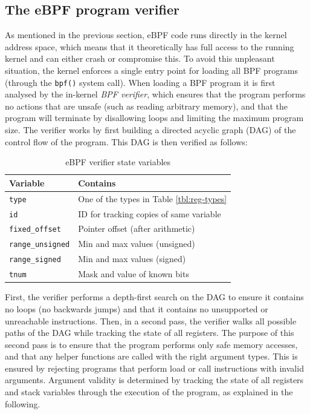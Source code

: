 \documentclass[10pt,sigconf]{acmart}
\begin{document}
\subsection{The eBPF program verifier}
\label{sec:bpf-verifier}
As mentioned in the previous section, eBPF code runs directly in the kernel
address space, which means that it theoretically has full access to the running
kernel and can either crash or compromise this. To avoid this unpleasant
situation, the kernel enforces a single entry point for loading all BPF programs
(through the \texttt{bpf()} system call). When loading a BPF program it is first
analysed by the in-kernel \emph{BPF verifier}, which ensures that the program
performs no actions that are unsafe (such as reading arbitrary memory), and that
the program will terminate by disallowing loops and limiting the maximum program
size. The verifier works by first building a directed acyclic graph (DAG) of the
control flow of the program. This DAG is then verified as follows:

\begin{table}[tbp]
\caption{\label{tbl:vrf-state-vars}
eBPF verifier state variables}
\centering
\begin{tabular}{ll}
\toprule
Variable & Contains\\
\midrule
\texttt{type} & One of the types in Table \ref{tbl:reg-types}\\
\texttt{id} & ID for tracking copies of same variable\\
\texttt{fixed\_offset} & Pointer offset (after arithmetic)\\
\texttt{range\_unsigned} & Min and max values (unsigned)\\
\texttt{range\_signed} & Min and max values (signed)\\
\texttt{tnum} & Mask and value of known bits\\
\bottomrule
\end{tabular}
\end{table}

First, the verifier performs a depth-first search on the DAG to ensure it
contains no loops (no backwards jumps) and that it contains no unsupported or
unreachable instructions. Then, in a second pass, the verifier walks all
possible paths of the DAG while tracking the state of all registers. The purpose
of this second pass is to ensure that the program performs only safe memory
accesses, and that any helper functions are called with the right argument
types. This is ensured by rejecting programs that perform load or call
instructions with invalid arguments. Argument validity is determined by tracking
the state of all registers and stack variables through the execution of the
program, as explained in the following.
\end{document}
